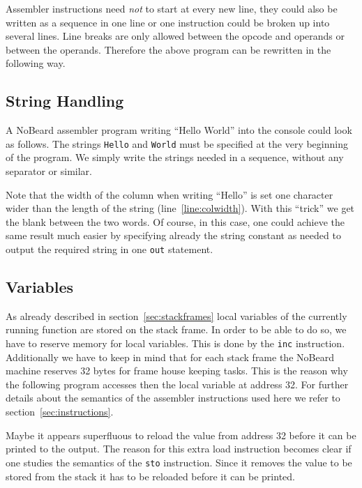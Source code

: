 \documentclass[11pt]{report}
\newcommand{\leongage}{NoBeard}
\begin{document}
Assembler instructions need {\em not} to start at every new line, they could also be written as a sequence in one line or one instruction could be broken up into several lines. Line breaks are only allowed between the opcode and operands or between the operands. Therefore the above program can be rewritten in the following way.


\subsection{String Handling}
A \leongage{} assembler program writing ``Hello World'' into the console could look as follows. The strings \lstinline$Hello$ and \lstinline$World$ must be specified at the very beginning of the program. We simply write the strings needed in a sequence, without any separator or similar.


Note that the width of the column when writing ``Hello'' is set one character wider than the length of the string (line~\ref{line:colwidth}). With this ``trick'' we get the blank between the two words. Of course, in this case, one could achieve the same result much easier by specifying already the string constant as needed to output the required string in one \lstinline$out$ statement.

\subsection{Variables}
As already described in section~\ref{sec:stackframes} local variables of the currently running function are stored on the stack frame. In order to be able to do so, we have to reserve memory for local variables. This is done by the \lstinline$inc$ instruction. Additionally we have to keep in mind that for each stack frame the \leongage{} machine reserves 32 bytes for frame house keeping tasks. This is the reason why the following program accesses then the local variable at address 32. For further details about the semantics of the assembler instructions used here we refer to section~\ref{sec:instructions}.



Maybe it appears superfluous to reload the value from address 32 before it can be printed to the output. The reason for this extra load instruction becomes clear if one studies the semantics of the \lstinline$sto$ instruction. Since it removes the value to be stored from the stack it has to be reloaded before it can be printed.
\end{document}
